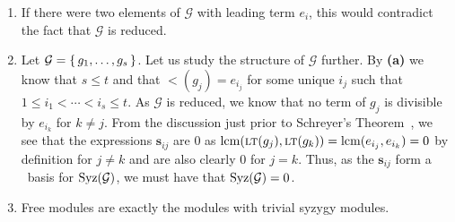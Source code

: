 \documentclass[letterpaper, 11pt, oneside]{book}
\begin{document}
\begin{sol}\label{ex:UAG_6.2.8}
  \begin{enumerate}
    \item If there were two elements of $\mathcal{G}$ with leading term $e_{i}$, this would contradict the fact that $\mathcal{G}$ is reduced.
    \item Let $\mathcal{G} = \set{g_{1}, \ldots, g_{s}}$.
          Let us study the structure of $\mathcal{G}$ further.
          By \textbf{(a)} we know that $s \leq t$ and that $\lt(g_{j}) = e_{i_{j}}$ for some unique $i_{j}$ such that $1 \leq i_{1} < \cdots < i_{s} \leq t$.
          As $\mathcal{G}$ is reduced, we know that no term of $g_{j}$ is divisible by $e_{i_{k}}$ for $k \neq j$.
          From the discussion just prior to Schreyer's Theorem~\cite[\S 5.3, Theorem 5.3]{book:UAG}, we see that the expressions $\mathbf{s}_{ij}$ are $0$ as $\operatorname{lcm}(\operatorname{\textsc{lt}}(g_{j}), \operatorname{\textsc{lt}}(g_{k})) = \operatorname{lcm}(e_{i_{j}}, e_{i_{k}}) = 0$ by definition for $j \neq k$ and are also clearly $0$ for $j = k$.
          Thus, as the $\mathbf{s}_{ij}$ form a \Grobner\ basis for $\operatorname{Syz}(\mathcal{G})$, we must have that $\operatorname{Syz}(\mathcal{G}) = 0$.
    \item Free modules are exactly the modules with trivial syzygy modules.
  \end{enumerate}
\end{sol}
\end{document}
